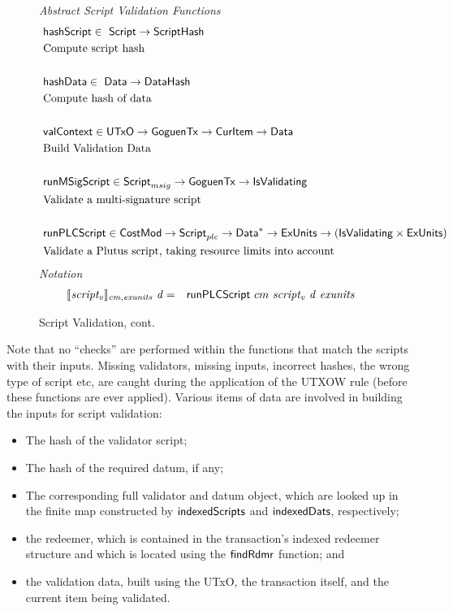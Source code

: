 \begin{figure*}[htb]
  \emph{Abstract Script Validation Functions}
  \begin{align*}
     &\mathsf{hashScript} \in  ~\mathsf{Script}\to \mathsf{ScriptHash} \\
     &\text{Compute script hash} \\~\\
     &\mathsf{hashData} \in  ~\mathsf{Data} \to \mathsf{DataHash} \\
     &\text{Compute hash of data} \\~\\
     &\mathsf{valContext} \in  \mathsf{UTxO} \to \mathsf{GoguenTx} \to \mathsf{CurItem} \to \mathsf{Data} \\
     &\text{Build Validation Data} \\~\\
     &\mathsf{runMSigScript} \in\mathsf{Script}_{msig}\to \mathsf{GoguenTx} \to \mathsf{IsValidating}  \\
     &\text{Validate a multi-signature script} \\~\\
     &\mathsf{runPLCScript} \in \mathsf{CostMod} \to\mathsf{Script}_{plc} \to
    \mathsf{Data}^{*} \to \mathsf{ExUnits} \to (\mathsf{IsValidating} \times \mathsf{ExUnits}) \\
     &\text{Validate a Plutus script, taking resource limits into account}
  \end{align*}
  \emph{Notation}
  \begin{align*}
    \llbracket \mathit{script_v} \rrbracket_{\mathit{cm},\mathit{exunits}}~\mathit{d}
    &=& \mathsf{runPLCScript} ~{cm}~\mathit{script_v}~\mathit{d}~\mathit{exunits}
  \end{align*}
  \caption{Script Validation, cont.}
  \label{fig:defs:functions-valid}
\end{figure*}

Note that no ``checks'' are performed within the functions that match the
scripts with their inputs. Missing validators, missing inputs, incorrect hashes, the wrong type of script etc,
are caught during the application of the UTXOW rule (before these functions are ever applied).
%
Various items of data are involved in building the inputs for script validation:

\begin{itemize}
\item The hash of the validator script;

\item The hash of the required datum, if any;

\item The corresponding full validator and datum object, which are looked up in the finite map
constructed by $\mathsf{indexedScripts}$ and $\mathsf{indexedDats}$, respectively;

\item the redeemer, which is contained in the transaction's indexed redeemer structure
and which is located using the $\mathsf{findRdmr}$ function; and

\item the validation data, built using the UTxO, the transaction itself,
and the current item being validated.
\end{itemize}


